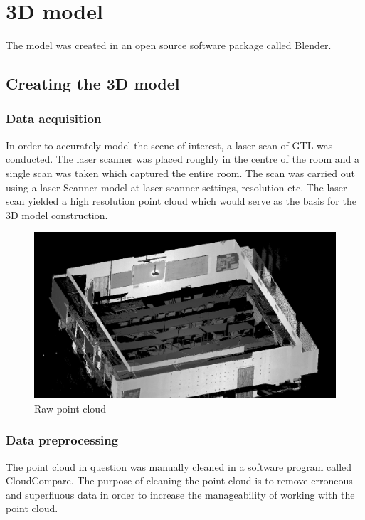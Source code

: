 \documentclass[11pt,a4paper]{report}
\begin{document}
	\section{3D model}
		The model was created in an open source software package called Blender.
		
		\subsection{Creating the 3D model}
			\subsubsection{Data acquisition}
				In order to accurately model the scene of interest, a laser scan of GTL was conducted. The laser scanner was placed roughly in the centre of the room and a single scan was taken which captured the entire room. The scan was carried out using a {{laser Scanner model}} at {{laser scanner settings, resolution etc}}. The laser scan yielded a high resolution point cloud which would serve as the basis for the 3D model construction.
				
				\begin{figure}[H]
					\centering
					\includegraphics[width=1\textwidth]{raw_point_cloud_1}
					\caption{Raw point cloud}
				\end{figure}
				
			\subsubsection{Data preprocessing}
				The point cloud in question was manually cleaned in a software program called CloudCompare. The purpose of cleaning the point cloud is to remove erroneous and superfluous data in order to increase the manageability of working with the point cloud.
	
\end{document}
